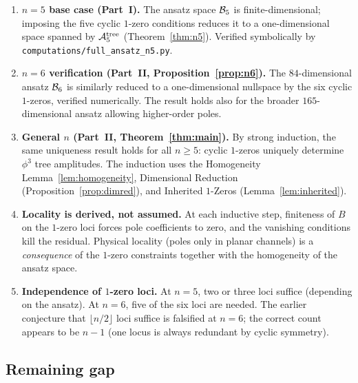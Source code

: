 \begin{enumerate}[label=(\arabic*)]
  \item \textbf{$n = 5$ base case (Part~I).}
    The ansatz space $\mathcal{B}_5$ is finite-dimensional;
    imposing the five cyclic $1$-zero conditions
    reduces it to a one-dimensional space spanned
    by $\mathcal{A}_5^{\mathrm{tree}}$ (Theorem~\ref{thm:n5}).
    Verified symbolically by
    \texttt{computations/full\_ansatz\_n5.py}.

  \item \textbf{$n = 6$ verification (Part~II,
    Proposition~\ref{prop:n6}).}
    The $84$-dimensional ansatz $\mathcal{B}_6$ is similarly
    reduced to a one-dimensional nullspace by the six
    cyclic $1$-zeros, verified numerically.
    The result holds also for the broader $165$-dimensional
    ansatz allowing higher-order poles.

  \item \textbf{General $n$ (Part~II, Theorem~\ref{thm:main}).}
    By strong induction, the same uniqueness result holds
    for all $n \geq 5$: cyclic $1$-zeros uniquely determine
    $\phi^3$ tree amplitudes. The induction uses the
    Homogeneity Lemma~\ref{lem:homogeneity},
    Dimensional Reduction (Proposition~\ref{prop:dimred}),
    and Inherited $1$-Zeros (Lemma~\ref{lem:inherited}).

  \item \textbf{Locality is derived, not assumed.}
    At each inductive step, finiteness of $B$ on the
    $1$-zero loci forces pole coefficients to zero,
    and the vanishing conditions kill the residual.
    Physical locality (poles only in planar channels)
    is a \emph{consequence} of the $1$-zero constraints
    together with the homogeneity of the ansatz space.

  \item \textbf{Independence of $1$-zero loci.}
    At $n = 5$, two or three loci suffice (depending on
    the ansatz). At $n = 6$, five of the six loci are
    needed. The earlier conjecture that $\lfloor n/2 \rfloor$
    loci suffice is falsified at $n = 6$; the correct
    count appears to be $n - 1$ (one locus is always
    redundant by cyclic symmetry).
\end{enumerate}

\subsection*{Remaining gap}

